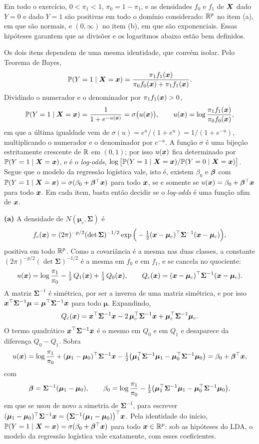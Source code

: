 \begin{solucao}
Em todo o exercício, $0<\pi_1<1$, $\pi_0=1-\pi_1$, e as densidades $f_0$ e $f_1$ de $\bm{X}$
dado $Y=0$ e dado $Y=1$ são positivas em todo o domínio considerado: $\mathbb{R}^p$ no item (a), em
que são normais, e $(0,\infty)$ no item (b), em que são exponenciais. Essas hipóteses garantem
que as divisões e os logaritmos abaixo estão bem definidos.

Os dois itens dependem de uma mesma identidade, que convém isolar. Pelo Teorema de Bayes,
\[
  \mathbb{P}(Y=1\mid\bm{X}=\bm{x})=\frac{\pi_1f_1(\bm{x})}{\pi_0f_0(\bm{x})+\pi_1f_1(\bm{x})} .
\]
Dividindo o numerador e o denominador por $\pi_1f_1(\bm{x})>0$,
\[
  \mathbb{P}(Y=1\mid\bm{X}=\bm{x})=\frac{1}{1+e^{-u(\bm{x})}}=\sigma\big(u(\bm{x})\big),
  \qquad
  u(\bm{x})=\log\frac{\pi_1f_1(\bm{x})}{\pi_0f_0(\bm{x})},
\]
em que a última igualdade vem de $\sigma(u)=e^u/(1+e^u)=1/(1+e^{-u})$, multiplicando o
numerador e o denominador por $e^{-u}$. A função $\sigma$ é uma bijeção estritamente crescente
de $\mathbb{R}$ em $(0,1)$; por isso $u(\bm{x})$ fica determinado por $\mathbb{P}(Y=1\mid\bm{X}=\bm{x})$, e é o
\emph{log-odds}, $\log\big[\mathbb{P}(Y=1\mid\bm{X}=\bm{x})/\mathbb{P}(Y=0\mid\bm{X}=\bm{x})\big]$. Segue que o modelo
da regressão logística vale, isto é, existem $\beta_0$ e $\bm{\beta}$ com
$\mathbb{P}(Y=1\mid\bm{X}=\bm{x})=\sigma(\beta_0+\bm{\beta}^\top\bm{x})$ para todo $\bm{x}$, se e somente se
$u(\bm{x})=\beta_0+\bm{\beta}^\top\bm{x}$ para todo $\bm{x}$. Em cada item, basta então decidir se o
\emph{log-odds} é uma função afim de $\bm{x}$.

\smallskip
\textbf{(a)} A densidade de $N(\bm\mu_c,\bm\Sigma)$ é
\[
  f_c(\bm{x})=(2\pi)^{-p/2}(\det\bm\Sigma)^{-1/2}
          \exp\Big(-\tfrac12(\bm{x}-\bm\mu_c)^\top\bm\Sigma^{-1}(\bm{x}-\bm\mu_c)\Big),
\]
positiva em todo $\mathbb{R}^p$. Como a covariância é a mesma nas duas classes, a constante
$(2\pi)^{-p/2}(\det\bm\Sigma)^{-1/2}$ é a mesma em $f_0$ e em $f_1$, e se cancela no
quociente:
\[
  u(\bm{x})=\log\frac{\pi_1}{\pi_0}-\tfrac12\,Q_1(\bm{x})+\tfrac12\,Q_0(\bm{x}),
  \qquad
  Q_c(\bm{x})=(\bm{x}-\bm\mu_c)^\top\bm\Sigma^{-1}(\bm{x}-\bm\mu_c).
\]
A matriz $\bm\Sigma^{-1}$ é simétrica, por ser a inversa de uma matriz simétrica, e por isso
$\bm{x}^\top\bm\Sigma^{-1}\bm\mu=\bm\mu^\top\bm\Sigma^{-1}\bm{x}$ para todo $\bm\mu$. Expandindo,
\[
  Q_c(\bm{x})=\bm{x}^\top\bm\Sigma^{-1}\bm{x}-2\,\bm\mu_c^\top\bm\Sigma^{-1}\bm{x}
          +\bm\mu_c^\top\bm\Sigma^{-1}\bm\mu_c .
\]
O termo quadrático $\bm{x}^\top\bm\Sigma^{-1}\bm{x}$ é o mesmo em $Q_0$ e em $Q_1$ e desaparece da
diferença $Q_0-Q_1$. Sobra
\[
  u(\bm{x})=\log\frac{\pi_1}{\pi_0}+(\bm\mu_1-\bm\mu_0)^\top\bm\Sigma^{-1}\bm{x}
        -\tfrac12\big(\bm\mu_1^\top\bm\Sigma^{-1}\bm\mu_1-\bm\mu_0^\top\bm\Sigma^{-1}\bm\mu_0\big)
  =\beta_0+\bm{\beta}^\top\bm{x},
\]
com
\[
  \bm{\beta}=\bm\Sigma^{-1}(\bm\mu_1-\bm\mu_0),
  \qquad
  \beta_0=\log\frac{\pi_1}{\pi_0}
     -\tfrac12\big(\bm\mu_1^\top\bm\Sigma^{-1}\bm\mu_1-\bm\mu_0^\top\bm\Sigma^{-1}\bm\mu_0\big),
\]
em que se usou de novo a simetria de $\bm\Sigma^{-1}$, para escrever
$(\bm\mu_1-\bm\mu_0)^\top\bm\Sigma^{-1}\bm{x}=\big(\bm\Sigma^{-1}(\bm\mu_1-\bm\mu_0)\big)^\top\bm{x}$.
Pela identidade do início, $\mathbb{P}(Y=1\mid\bm{X}=\bm{x})=\sigma(\beta_0+\bm{\beta}^\top\bm{x})$ para todo
$\bm{x}\in\mathbb{R}^p$: sob as hipóteses do LDA, o modelo da regressão logística vale exatamente, com
esses coeficientes.


\end{solucao}
